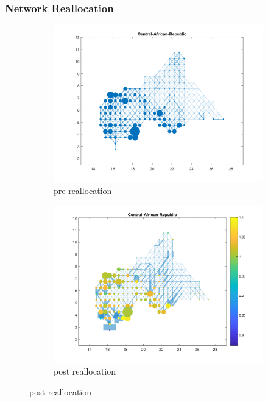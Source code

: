 \documentclass[]{beamer}   	%
\begin{document}
\begin{frame}
  \frametitle{Network Reallocation}
\begin{figure}
\begin{subfigure}[c]{0.48\textwidth}
\includegraphics[width=\textwidth, trim={2cm 1cm 1.5cm 0cm},clip]{../../Build/output/Matlab_graphs/Nicer_graphs/Central-African-Republic_stat.png}
\caption{pre reallocation}
\label{fig:cae_pre}
\end{subfigure}
\begin{subfigure}[c]{0.48\textwidth}
\includegraphics[width=\textwidth, trim={2cm 1cm 1.5cm 0cm},clip]{../../Build/output/Matlab_graphs/Nicer_graphs/Central-African-Republic_opt.png}
\caption{post reallocation}
\label{fig:cae_post}
\end{subfigure}
\end{figure}
\end{frame}
\end{document}
